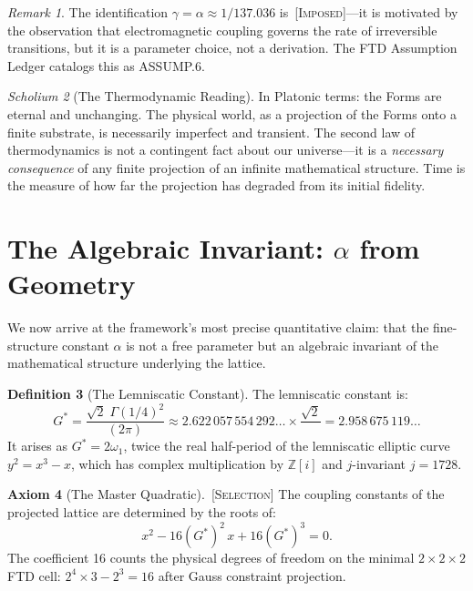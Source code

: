 \documentclass[11pt,twoside]{article}
\theoremstyle{definition}
\newtheorem{axiom}{Axiom}
\newtheorem{definition}[axiom]{Definition}
\theoremstyle{plain}
\theoremstyle{remark}
\newtheorem{remark}[axiom]{Remark}
\newtheorem{scholium}[axiom]{Scholium}
\newcommand{\etag}[1]{\,\textnormal{\textsc{\footnotesize[#1]}}}
\newcommand{\selection}{\etag{Selection}}
\newcommand{\imposed}{\etag{Imposed}}
\newcommand{\Gstar}{G^{*}}
\newcommand{\Integer}{\mathbb{Z}}
\begin{document}
\begin{remark}
The identification $\gamma = \alpha \approx 1/137.036$ is \imposed{}---it is motivated by the observation that electromagnetic coupling governs the rate of irreversible transitions, but it is a parameter choice, not a derivation. The FTD Assumption Ledger catalogs this as ASSUMP.6.
\end{remark}

\begin{scholium}[The Thermodynamic Reading]
In Platonic terms: the Forms are eternal and unchanging. The physical world, as a projection of the Forms onto a finite substrate, is necessarily imperfect and transient. The second law of thermodynamics is not a contingent fact about our universe---it is a \emph{necessary consequence} of any finite projection of an infinite mathematical structure. Time is the measure of how far the projection has degraded from its initial fidelity.
\end{scholium}

\section{The Algebraic Invariant: $\alpha$ from Geometry}

We now arrive at the framework's most precise quantitative claim: that the fine-structure constant $\alpha$ is not a free parameter but an algebraic invariant of the mathematical structure underlying the lattice.

\begin{definition}[The Lemniscatic Constant]\label{def:gstar}
The lemniscatic constant is:
\begin{equation}
    \Gstar = \frac{\sqrt{2}\;\Gamma(1/4)^2}{(2\pi)} \approx 2.622\,057\,554\,292\ldots \times \frac{\sqrt{2}}{\phantom{2}} = 2.958\,675\,119\ldots
\end{equation}
It arises as $\Gstar = 2\omega_1$, twice the real half-period of the lemniscatic elliptic curve $y^2 = x^3 - x$, which has complex multiplication by $\Integer[i]$ and $j$-invariant $j = 1728$.
\end{definition}

\begin{axiom}[The Master Quadratic]\label{ax:quadratic}\selection
The coupling constants of the projected lattice are determined by the roots of:
\begin{equation}
    x^2 - 16(\Gstar)^2\,x + 16(\Gstar)^3 = 0.
\end{equation}
The coefficient 16 counts the physical degrees of freedom on the minimal $2 \times 2 \times 2$ FTD cell: $2^4 \times 3 - 2^3 = 16$ after Gauss constraint projection.
\end{axiom}
\end{document}
